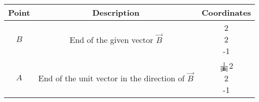 \begin{center}
    \begin{tabular}{|c|c|c|} 
        \hline
            \textbf{Point} & \textbf{Description} & \textbf{Coordinates} \\ 
        \hline
	    $B$   & End of the given vector $\vec{B}$ & \myvec{2 \\ 2 \\ -1} \\ 
        \hline
	    $A$   & End of the unit vector in the direction of $\vec{B}$ & $\frac{1}{\left\lVert\mathbf{B}\right\rVert}$\myvec{2 \\ 2 \\ -1}\\ 
        \hline
    \end{tabular}
\end{center}  
